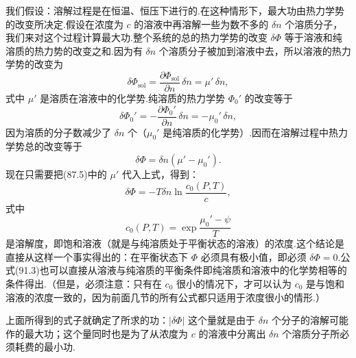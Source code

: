 我们假设：溶解过程是在恒温、恒压下进行的.在这种情形下，最大功由热力学势的改变所决定.假设在浓度为 $c$ 的溶液中再溶解一些为数不多的 $\delta n$ 个溶质分子，我们来对这个过程计算最大功.整个系统的总的热力学势的改变 $\delta\varPhi$ 等于溶液和纯溶质的热力势的改变之和.因为有 $\delta n$ 个溶质分子被加到溶液中去，所以溶液的热力学势的改变为
\begin{equation*}
  \delta\varPhi_{\mathrm{sol}}
  =\frac{\partial\varPhi_{\mathrm{sol}}}{\partial n}\,\delta n
  =\mu'\,\delta n,
\end{equation*}
式中 $\mu'$ 是溶质在溶液中的化学势.纯溶质的热力学势 $\varPhi_0'$ 的改变等于
\begin{equation*}
  \delta\varPhi_0'=-\frac{\partial\varPhi_0'}{\partial n}\,\delta n
  =-\mu_0'\,\delta n,
\end{equation*}
因为溶质的分子数减少了 $\delta n$ 个（$\mu_0'$ 是纯溶质的化学势）.因而在溶解过程中热力学势总的改变等于
\begin{equation}
  \delta\varPhi=\delta n(\mu'-\mu_0').
\end{equation}
现在只需要把(87.5)中的 $\mu'$ 代入上式，得到：
\begin{equation}
  \delta\varPhi=-T\delta n\ln\frac{c_0(P,T)}{c},
\end{equation}
式中
\begin{equation}
  c_0(P,T)=\exp\frac{\mu_0'-\psi}{T}
\end{equation}
是溶解度，即饱和溶液（就是与纯溶质处于平衡状态的溶液）的浓度.这个结论是直接从这样一个事实得出的：在平衡状态下 $\varPhi$ 必须具有极小值，即必须 $\delta\varPhi=0$.公式(91.3)也可以直接从溶液与纯溶质的平衡条件即纯溶质和溶液中的化学势相等的条件得出.（但是，必须注意：只有在 $c_0$ 很小的情况下，才可以认为 $c_0$ 是与饱和溶液的浓度一致的，因为前面几节的所有公式都只适用于浓度很小的情形.）

上面所得到的式子就确定了所求的功：$|\delta\varPhi|$ 这个量就是由于 $\delta n$ 个分子的溶解可能作的最大功；这个量同时也是为了从浓度为 $c$ 的溶液中分离出 $\delta n$ 个溶质分子所必须耗费的最小功.

